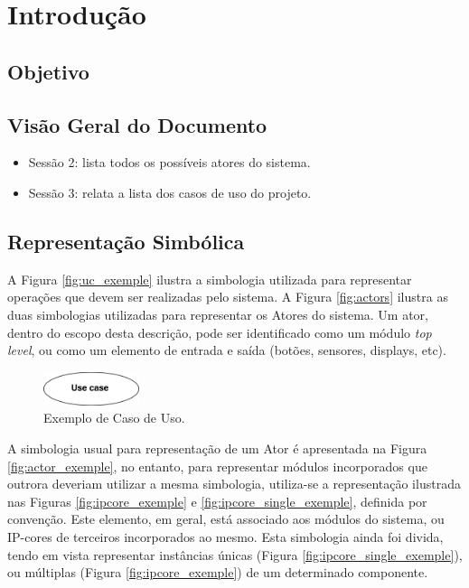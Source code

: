 \documentclass{article}
\begin{document}
\section{Introdução}

  \subsection{Objetivo}
  
  \subsection{Visão Geral do Documento}
  \begin{itemize}
    \item Sessão 2: lista todos os possíveis atores do sistema.
    \item Sessão 3: relata a lista dos casos de uso do projeto.
  \end{itemize}
  
  \subsection{Representação Simbólica}
  A Figura \ref{fig:uc_exemple} ilustra a simbologia utilizada para representar operações que devem ser realizadas pelo sistema. A Figura \ref{fig:actors} ilustra as duas simbologias utilizadas para representar os Atores do sistema. Um ator, dentro do escopo desta descrição, pode ser identificado como um módulo \textit{top level}, ou como um elemento de entrada e saída (botões, sensores, displays, etc).
  
  \FloatBarrier
  \begin{figure}[H]
    \centering
    \includegraphics[width=0.25\textwidth]{uc_exemple.png}
    \caption{Exemplo de Caso de Uso.}
    \label{uc_exemple}
  \end{figure}  
  
  A simbologia usual para representação de um Ator é apresentada na Figura \ref{fig:actor_exemple}, no entanto, para representar módulos incorporados que outrora deveriam utilizar a mesma simbologia, utiliza-se a representação ilustrada nas Figuras \ref{fig:ipcore_exemple} e \ref{fig:ipcore_single_exemple}, definida por convenção. Este elemento, em geral, está associado aos módulos do sistema, ou IP-cores de terceiros incorporados ao mesmo. Esta simbologia ainda foi divida, tendo em vista representar instâncias únicas (Figura \ref{fig:ipcore_single_exemple}), ou múltiplas (Figura \ref{fig:ipcore_exemple}) de um determinado componente. 
  
\end{document}
